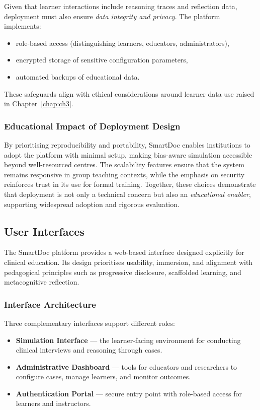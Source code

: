 Given that learner interactions include reasoning traces and reflection data,
deployment must also ensure \emph{data integrity and privacy}. The platform
implements:
\begin{itemize}
    \item role-based access (distinguishing learners, educators, administrators),
    \item encrypted storage of sensitive configuration parameters,
    \item automated backups of educational data.
\end{itemize}

These safeguards align with ethical considerations around learner data use raised
in Chapter~\ref{chap:ch3}.

\subsubsection{Educational Impact of Deployment Design}

By prioritising reproducibility and portability, SmartDoc enables institutions
to adopt the platform with minimal setup, making bias-aware simulation accessible
beyond well-resourced centres. The scalability features ensure that the system
remains responsive in group teaching contexts, while the emphasis on security
reinforces trust in its use for formal training. Together, these choices demonstrate
that deployment is not only a technical concern but also an \emph{educational enabler},
supporting widespread adoption and rigorous evaluation.

\subsection{User Interfaces}
\label{sec:user_interfaces}

The SmartDoc platform provides a web-based interface designed explicitly for
clinical education. Its design prioritises usability, immersion, and alignment
with pedagogical principles such as progressive disclosure, scaffolded learning,
and metacognitive reflection.

\subsubsection{Interface Architecture}

Three complementary interfaces support different roles:

\begin{itemize}
    \item \textbf{Simulation Interface} — the learner-facing environment for
    conducting clinical interviews and reasoning through cases.
    \item \textbf{Administrative Dashboard} — tools for educators and researchers
    to configure cases, manage learners, and monitor outcomes.
    \item \textbf{Authentication Portal} — secure entry point with role-based
    access for learners and instructors.
\end{itemize}

